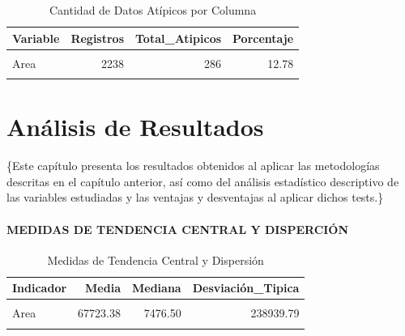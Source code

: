 \documentclass[oneside,11pt]{Latex/Classes/PhDthesisPSnPDF}
\begin{document}
\begin{table}[!h]
\centering
\caption{\label{tab:unnamed-chunk-4}Cantidad de Datos Atípicos por Columna}
\centering
\fontsize{10}{12}\selectfont
\begin{tabular}[t]{lrrr}
\toprule
Variable & Registros & Total\_Atipicos & Porcentaje\\
\midrule
\cellcolor{gray!10}{Produccion} & \cellcolor{gray!10}{2238} & \cellcolor{gray!10}{435} & \cellcolor{gray!10}{19.44}\\
Area & 2238 & 286 & 12.78\\
\cellcolor{gray!10}{Rendimiento} & \cellcolor{gray!10}{2238} & \cellcolor{gray!10}{337} & \cellcolor{gray!10}{15.06}\\
\bottomrule
\end{tabular}
\end{table}

\chapter{Análisis de Resultados}

\{\small Este capítulo presenta los resultados obtenidos al aplicar las
metodologías descritas en el capítulo anterior, así como del análisis
estadístico descriptivo de las variables estudiadas y las ventajas y
desventajas al aplicar dichos tests.\}

\subsubsection*{MEDIDAS DE TENDENCIA CENTRAL Y DISPERCIÓN}

\begin{table}[!h]
\centering
\caption{\label{tab:unnamed-chunk-5}Medidas de Tendencia Central y Dispersión}
\centering
\fontsize{10}{12}\selectfont
\begin{tabular}[t]{lrrr}
\toprule
Indicador & Media & Mediana & Desviación\_Tipica\\
\midrule
\cellcolor{gray!10}{Production} & \cellcolor{gray!10}{68741614.34} & \cellcolor{gray!10}{24762.00} & \cellcolor{gray!10}{537174070.52}\\
Area & 67723.38 & 7476.50 & 238939.79\\
\cellcolor{gray!10}{Yield} & \cellcolor{gray!10}{336.74} & \cellcolor{gray!10}{3.84} & \cellcolor{gray!10}{1732.53}\\
\bottomrule
\end{tabular}
\end{table}
\end{document}
